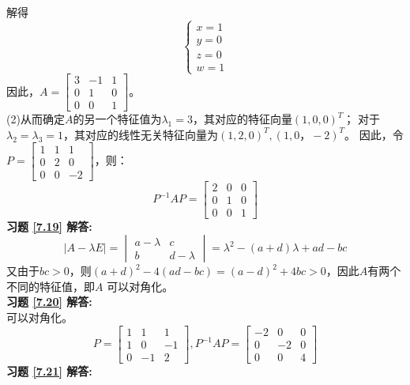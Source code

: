 解得
\begin{equation*}
 \begin{cases}
 x=1\\
 y=0\\
 z=0\\
 w=1
 \end{cases}
\end{equation*}
因此，$A=\begin{bmatrix}3&-1&1\\0&1&0\\0&0&1\end{bmatrix}$。\\
(2)从而确定$A$的另一个特征值为$\lambda_1=3$，其对应的特征向量$(1,0,0)^T$；
对于$\lambda_2=\lambda_3=1$，其对应的线性无关特征向量为$(1,2,0)^T,(1,0，-2)^T$。
因此，令$P=\begin{bmatrix}1&1&1\\0&2&0\\0&0&-2\end{bmatrix}$，则：
\begin{equation*}
 P^{-1}AP=\begin{bmatrix}2&0&0\\0&1&0\\0&0&1\end{bmatrix}
\end{equation*}
\textbf{习题 \ref{7.19} 解答:}\\
\begin{equation*}
|A-\lambda E|=\begin{vmatrix}a-\lambda&c\\b&d-\lambda\end{vmatrix}=\lambda^2-(a+d)\lambda+ad-bc
\end{equation*}
又由于$bc>0$，则$(a+d)^2-4(ad-bc)=(a-d)^2+4bc>0$，因此$A$有两个不同的特征值，即$A$ 可以对角化。\\
\textbf{习题 \ref{7.20} 解答:}\\
可以对角化。
\begin{equation*}
  P=\begin{bmatrix}1&1&1\\1&0&-1\\0&-1&2\end{bmatrix},
  P^{-1}AP=\begin{bmatrix}-2&0&0\\0&-2&0\\0&0&4\end{bmatrix}
\end{equation*}
\textbf{习题 \ref{7.21} 解答:}\\

